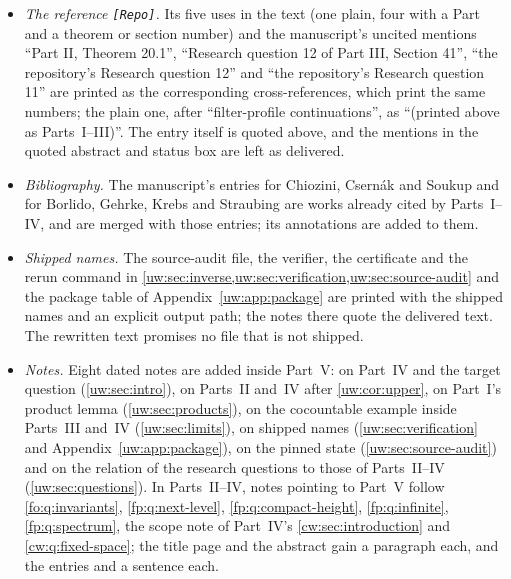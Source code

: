 \documentclass[11pt,letterpaper]{article}
\numberwithin{equation}{section}
\theoremstyle{definition}
\theoremstyle{remark}
\theoremstyle{definition}
\newcommand{\ceil}[1]{\left\lceil#1\right\rceil}
\newcommand{\N}{\mathbb N}
\newcommand{\W}{\mathcal W}
\newcommand{\A}{\mathcal A}
\newcommand{\scs}{\operatorname{scs}}
\newcommand{\smq}{\operatorname{sm}_{q}}
\newcommand{\subseq}{\preccurlyeq}
\newcommand{\Tw}{\mathsf K}
\newcommand{\floor}[1]{\left\lfloor #1\right\rfloor}
\newcommand{\nextpos}{\operatorname{next}}
\begin{document}
\begin{itemize}
the same; its \verb|\N|, \verb|\W|, \verb|\A|, \verb|\smq|, \verb|\subseq|,
\verb|\ceil|, \verb|\floor| and \verb|\scs| are those of Parts~I--III, with
the same meanings; its \verb|\nextpos| is new; its unused \verb|\supp| and
\verb|\Tw| are dropped. Its arithmetic spectra $F_{h,t}(q)$ and $E_{h,t}(q)$
of \eqref{uw:eq:arithmetic-spectrum} are printed $\Phi_{h,t}(q)$ and
$\Psi_{h,t}(q)$ (and its $F(q)$, $F(Q)$ as $\Phi(q)$, $\Phi(Q)$), because
Part~IV's $F_v$ is a nested closure and Part~I's $F_i$ a layer; the
normalization is unchanged. The manuscript's ``height'' of a space is its
last derivative rank $h$, as in the phrase ``heights $h\ge2$'' of
Parts~II and~III, not the height $h+1$ of
Part~I's Appendix~B and of Part~IV; the words are kept and the notation
table says so. The notation table is \cref{uw:sec:notation}.
\item \emph{The reference \texttt{[Repo]}.} Its five uses in the text (one
plain, four with a Part and a theorem or section number) and the
manuscript's uncited mentions ``Part II, Theorem 20.1'', ``Research
question 12 of Part III, Section 41'', ``the repository's Research question
12'' and ``the repository's Research question 11'' are printed as the corresponding cross-references, which print the same
numbers; the plain one, after ``filter-profile continuations'', as
``(printed above as Parts~I--III)''. The entry itself is quoted above, and
the mentions in the quoted abstract and status box are left as delivered.
\item \emph{Bibliography.} The manuscript's entries for Chiozini, Csern\'ak
and Soukup \cite{CCS} and for Borlido, Gehrke, Krebs and Straubing
\cite{BGKS} are works already cited by Parts~I--IV, and are merged with
those entries; its annotations are added to them.
\item \emph{Shipped names.} The source-audit file, the verifier, the
certificate and the rerun command in
\cref{uw:sec:inverse,uw:sec:verification,uw:sec:source-audit} and the
package table of Appendix~\ref{uw:app:package} are printed with the shipped
names and an explicit output path; the notes there quote the delivered
text. The rewritten text promises no file that is not shipped.
\item \emph{Notes.} Eight dated notes are added inside Part~V: on Part~IV
and the target question (\cref{uw:sec:intro}), on Parts~II and~IV after
\cref{uw:cor:upper}, on Part~I's product lemma (\cref{uw:sec:products}), on
the cocountable example inside Parts~III and~IV (\cref{uw:sec:limits}), on
shipped names (\cref{uw:sec:verification} and
Appendix~\ref{uw:app:package}), on the pinned state
(\cref{uw:sec:source-audit}) and on the relation of the research questions
to those of Parts~II--IV (\cref{uw:sec:questions}). In Parts~II--IV, notes
pointing to Part~V follow \cref{fo:q:invariants}, \cref{fp:q:next-level},
\cref{fp:q:compact-height}, \cref{fp:q:infinite}, \cref{fp:q:spectrum}, the
scope note of Part~IV's \cref{cw:sec:introduction} and
\cref{cw:q:fixed-space}; the title page and the abstract gain a paragraph
each, and the entries \cite{CCS} and \cite{BGKS} a sentence each.
\end{itemize}
\end{document}
